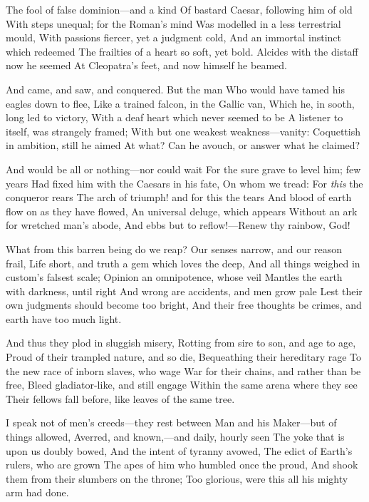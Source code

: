 \documentclass[10pt,twocolumn]{book}
\begin{document}
   The fool of false dominion---and a kind
   Of bastard Caesar, following him of old
   With steps unequal; for the Roman's mind
   Was modelled in a less terrestrial mould,
   With passions fiercer, yet a judgment cold,
   And an immortal instinct which redeemed
   The frailties of a heart so soft, yet bold.
   Alcides with the distaff now he seemed
At Cleopatra's feet, and now himself he beamed.


   And came, and saw, and conquered.  But the man
   Who would have tamed his eagles down to flee,
   Like a trained falcon, in the Gallic van,
   Which he, in sooth, long led to victory,
   With a deaf heart which never seemed to be
   A listener to itself, was strangely framed;
   With but one weakest weakness---vanity:
   Coquettish in ambition, still he aimed
At what?  Can he avouch, or answer what he claimed?


   And would be all or nothing---nor could wait
   For the sure grave to level him; few years
   Had fixed him with the Caesars in his fate,
   On whom we tread:  For \textit{this} the conqueror rears
   The arch of triumph! and for this the tears
   And blood of earth flow on as they have flowed,
   An universal deluge, which appears
   Without an ark for wretched man's abode,
And ebbs but to reflow!---Renew thy rainbow, God!


   What from this barren being do we reap?
   Our senses narrow, and our reason frail,
   Life short, and truth a gem which loves the deep,
   And all things weighed in custom's falsest scale;
   Opinion an omnipotence, whose veil
   Mantles the earth with darkness, until right
   And wrong are accidents, and men grow pale
   Lest their own judgments should become too bright,
And their free thoughts be crimes, and earth have too much light.


   And thus they plod in sluggish misery,
   Rotting from sire to son, and age to age,
   Proud of their trampled nature, and so die,
   Bequeathing their hereditary rage
   To the new race of inborn slaves, who wage
   War for their chains, and rather than be free,
   Bleed gladiator-like, and still engage
   Within the same arena where they see
Their fellows fall before, like leaves of the same tree.


   I speak not of men's creeds---they rest between
   Man and his Maker---but of things allowed,
   Averred, and known,---and daily, hourly seen\textemdash
   The yoke that is upon us doubly bowed,
   And the intent of tyranny avowed,
   The edict of Earth's rulers, who are grown
   The apes of him who humbled once the proud,
   And shook them from their slumbers on the throne;
Too glorious, were this all his mighty arm had done.
\end{document}
